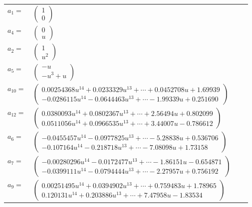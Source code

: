 \documentclass[1p]{elsarticle_modified}
\theoremstyle{definition}
\begin{document}
\begin{tabular}{m{7pt} m{180pt} m{7pt} m{180pt} }
\flushright $a_{1}=$&$\begin{pmatrix}1\\0\end{pmatrix}$ \\
\flushright $a_{4}=$&$\begin{pmatrix}0\\u\end{pmatrix}$ \\
\flushright $a_{2}=$&$\begin{pmatrix}1\\u^2\end{pmatrix}$ \\
\flushright $a_{5}=$&$\begin{pmatrix}- u\\- u^3+u\end{pmatrix}$ \\
\flushright $a_{10}=$&$\begin{pmatrix}0.00254368 u^{14}+0.0233329 u^{13}+\cdots+0.0452708 u+1.69939\\-0.0286115 u^{14}-0.0644463 u^{13}+\cdots-1.99339 u+0.251690\end{pmatrix}$ \\
\flushright $a_{12}=$&$\begin{pmatrix}0.0380093 u^{14}+0.0802367 u^{13}+\cdots+2.56494 u+0.802099\\0.0511056 u^{14}+0.0966535 u^{13}+\cdots+3.44007 u-0.786612\end{pmatrix}$ \\
\flushright $a_{6}=$&$\begin{pmatrix}-0.0455457 u^{14}-0.0977825 u^{13}+\cdots-5.28838 u+0.536706\\-0.107164 u^{14}-0.218718 u^{13}+\cdots-7.08098 u+1.73158\end{pmatrix}$ \\
\flushright $a_{7}=$&$\begin{pmatrix}-0.00280296 u^{14}-0.0172477 u^{13}+\cdots-1.86151 u-0.654871\\-0.0399111 u^{14}-0.0794444 u^{13}+\cdots-2.27957 u+0.756192\end{pmatrix}$ \\
\flushright $a_{9}=$&$\begin{pmatrix}0.00251495 u^{14}+0.0394902 u^{13}+\cdots+0.759483 u+1.78965\\0.120131 u^{14}+0.203886 u^{13}+\cdots+7.47958 u-1.83534\end{pmatrix}$ \\

\end{tabular}
\end{document}
